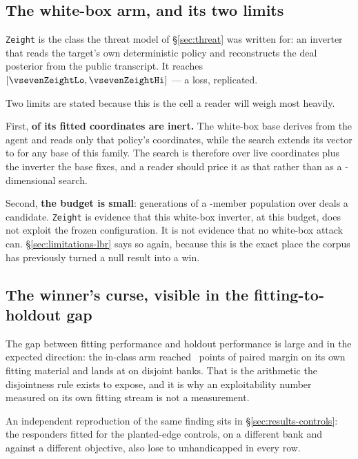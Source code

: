 \subsection{The white-box arm, and its two limits}
\label{sec:exploit-whitebox}

\texttt{Zeight} is the class the threat model of \S\ref{sec:threat} was written for: an inverter that
reads the target's own deterministic policy and reconstructs the deal posterior from the public
transcript. It reaches \vsevenZeightEdge{} $[\vsevenZeightLo, \vsevenZeightHi]$ --- a loss, replicated.

Two limits are stated because this is the cell a reader will weigh most heavily.

First, \textbf{\vsevenZeightInert{} of its fitted coordinates are inert.} The white-box base derives from the
\vsix{} agent and reads only that policy's \vsevenVsixCoords{} coordinates, while the search extends its
vector to \vsevenCoordinates{} for any base of this family. The search is therefore over \vsevenZeightLive{}
live coordinates plus the inverter the base fixes, and a reader should price it as that rather than as
a \vsevenCoordinates{}-dimensional search.

Second, \textbf{the budget is small}: \vsevenBfourGens{} generations of a
\vsevenBfourPop{}-member population over \vsevenBfourDeals{} deals a candidate. \texttt{Zeight}
is evidence that this white-box inverter, at this budget, does not exploit the frozen configuration.
It is not evidence that no white-box attack can. \S\ref{sec:limitations-lbr} says so again, because
this is the exact place the corpus has previously turned a null result into a win.

\subsection{The winner's curse, visible in the fitting-to-holdout gap}
\label{sec:exploit-curse}

The gap between fitting performance and holdout performance is large and in the expected direction:
the in-class arm reached \vsevenZoneFitMargin{}~points of paired margin on its own fitting material and lands at
\vsevenZoneEdge{} on disjoint banks. That is the arithmetic the disjointness rule exists to expose,
and it is why an exploitability number measured on its own fitting stream is not a measurement.

An independent reproduction of the same finding sits in \S\ref{sec:results-controls}: the responders
fitted for the planted-edge controls, on a different bank and against a different objective, also lose
to unhandicapped \frozen{} in every row.
